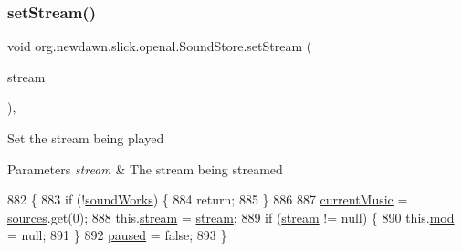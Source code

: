 \subsubsection{\texorpdfstring{set\+Stream()}{setStream()}}
{\footnotesize\ttfamily void org.\+newdawn.\+slick.\+openal.\+Sound\+Store.\+set\+Stream (\begin{DoxyParamCaption}\item[{\mbox{\hyperlink{classorg_1_1newdawn_1_1slick_1_1openal_1_1_open_a_l_stream_player}{Open\+A\+L\+Stream\+Player}}}]{stream }\end{DoxyParamCaption})\hspace{0.3cm}{\ttfamily [inline]}, {\ttfamily [package]}}

Set the stream being played


\begin{DoxyParams}{Parameters}
{\em stream} & The stream being streamed \\
\hline
\end{DoxyParams}

\begin{DoxyCode}
882                                               \{
883         \textcolor{keywordflow}{if} (!\mbox{\hyperlink{classorg_1_1newdawn_1_1slick_1_1openal_1_1_sound_store_ae563e9c1a01e333dc2350f1450f451fd}{soundWorks}}) \{
884             \textcolor{keywordflow}{return};
885         \}
886 
887         \mbox{\hyperlink{classorg_1_1newdawn_1_1slick_1_1openal_1_1_sound_store_a533d86a926110a3d75449fa186015f07}{currentMusic}} = \mbox{\hyperlink{classorg_1_1newdawn_1_1slick_1_1openal_1_1_sound_store_a3a2ffa73acd847102bb30140129c440b}{sources}}.get(0);
888         this.\mbox{\hyperlink{classorg_1_1newdawn_1_1slick_1_1openal_1_1_sound_store_a3529a80a2ca84a63d3bdc55194f52ac7}{stream}} = \mbox{\hyperlink{classorg_1_1newdawn_1_1slick_1_1openal_1_1_sound_store_a3529a80a2ca84a63d3bdc55194f52ac7}{stream}};
889         \textcolor{keywordflow}{if} (\mbox{\hyperlink{classorg_1_1newdawn_1_1slick_1_1openal_1_1_sound_store_a3529a80a2ca84a63d3bdc55194f52ac7}{stream}} != null) \{
890             this.\mbox{\hyperlink{classorg_1_1newdawn_1_1slick_1_1openal_1_1_sound_store_acfae79fd86ae031150acd19e30894aaa}{mod}} = null;
891         \}
892         \mbox{\hyperlink{classorg_1_1newdawn_1_1slick_1_1openal_1_1_sound_store_a44c472fda007e17b19478fc3d77e04e3}{paused}} = \textcolor{keyword}{false};
893     \}
\end{DoxyCode}
\mbox{\label{classorg_1_1newdawn_1_1slick_1_1openal_1_1_sound_store_afde3bd643c0a7b312643a8a8aa1d0524}} 
